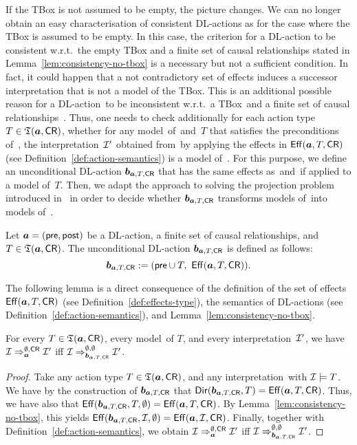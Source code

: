 If the TBox is not assumed to be empty, the picture changes.  We can no longer
obtain an easy characterisation of consistent DL-actions as for the case where
the TBox is assumed to be empty.  In this case, the criterion for a DL-action to
be consistent w.r.t.\ the empty TBox and a finite set of causal relationships
stated in Lemma~\ref{lem:consistency-no-tbox} is a necessary but not a
sufficient condition.  In fact, it could happen that a not contradictory set of
effects induces a successor interpretation that is not a model of the TBox.
This is an additional possible reason for a DL-action~\abf to be inconsistent
w.r.t.\ a TBox~\Tmc and a finite set of causal relationships~\CR.  Thus, one
needs to check additionally for each action type $T\in\mathfrak{T}(\boldsymbol a,\mathsf{CR})$, whether
for any model~\Imc of~\Tmc and~$T$ that satisfies the preconditions of~\abf, the
interpretation~$\mathcal{I}'$ obtained from~\Imc by applying the effects in
$\operatorname{\mathsf{Eff}}(\boldsymbol a,T,\mathsf{CR})$ (see Definition~\ref{def:action-semantics}) is a model
of~\Tmc.  For this purpose, we define an unconditional DL-action
$\boldsymbol b_{\boldsymbol a,T,\mathsf{CR}}$ that has the same effects as~\abf and~\CR if applied to a
model of~$T$.  Then, we adapt the approach to solving the projection problem
introduced in~\cite{BLM+-AAAI05} in order to decide whether $\boldsymbol b_{\boldsymbol a,T,\mathsf{CR}}$
transforms models of~\Tmc into models of~\Tmc.

\begin{definition}
    Let $\boldsymbol a=(\mathsf{pre},\mathsf{post})$ be a DL-action, \CR a finite set of
    causal relationships, and $T\in\mathfrak{T}(\boldsymbol a,\mathsf{CR})$.  The unconditional DL-action
    $\boldsymbol b_{\boldsymbol a,T,\mathsf{CR}}$ is defined as follows:
    \[\bbf_{\abf,T,\CR}:=(\pre\cup T,\ \Eff(\abf,T,\CR)).\]
\end{definition}

\noindent
The following lemma is a direct consequence of the definition of the set of
effects $\operatorname{\mathsf{Eff}}(\boldsymbol a,T,\mathsf{CR})$ (see Definition~\ref{def:effects-type}), the
semantics of DL-actions (see Definition~\ref{def:action-semantics}), and
Lemma~\ref{lem:consistency-no-tbox}.

\begin{lemma}\label{lem:sim-cr}
    For every $T\in\mathfrak{T}(\boldsymbol a,\mathsf{CR})$, every model~\Imc of $T$, and every
    interpretation~$\mathcal{I}'$, we have
    $\mathcal{I}\Rightarrow_{\boldsymbol a}^{\emptyset,\mathsf{CR}}\mathcal{I}'$ iff
    $\mathcal{I}\Rightarrow_{\boldsymbol b_{\boldsymbol a,T,\mathsf{CR}}}^{\emptyset,\emptyset}\mathcal{I}'$.
\end{lemma}

\begin{proof}
    Take any action type $T\in\mathfrak{T}(\boldsymbol a,\mathsf{CR})$, and any interpretation~\Imc with
    $\mathcal{I}\models T$.  We have by the construction of $\boldsymbol b_{\boldsymbol a,T,\mathsf{CR}}$ that
    $\operatorname{\mathsf{Dir}}(\boldsymbol b_{\boldsymbol a,T,\mathsf{CR}},T)=\operatorname{\mathsf{Eff}}(\boldsymbol a,T,\mathsf{CR})$.  Thus, we have also that
    $\operatorname{\mathsf{Eff}}(\boldsymbol b_{\boldsymbol a,T,\mathsf{CR}},T,\emptyset)=\operatorname{\mathsf{Eff}}(\boldsymbol a,T,\mathsf{CR})$.
    By Lemma~\ref{lem:consistency-no-tbox}, this yields
    $\operatorname{\mathsf{Eff}}(\boldsymbol b_{\boldsymbol a,T,\mathsf{CR}},\mathcal{I},\emptyset)=\operatorname{\mathsf{Eff}}(\boldsymbol a,\mathcal{I},\mathsf{CR})$.  Finally,
    together with Definition~\ref{def:action-semantics}, we obtain
    $\mathcal{I}\Rightarrow_{\boldsymbol a}^{\emptyset,\mathsf{CR}}\mathcal{I}'$ iff
    $\mathcal{I}\Rightarrow_{\boldsymbol b_{\boldsymbol a,T,\mathsf{CR}}}^{\emptyset,\emptyset}\mathcal{I}'$.
\end{proof}

